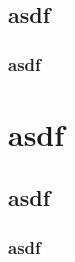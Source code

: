 
\subsection{asdf}
	\subsubsection{asdf}
	

\section{asdf}
	\subsection{asdf}
		\subsubsection{asdf}